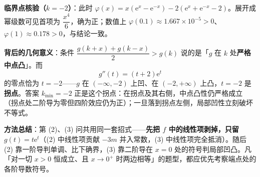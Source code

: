 \begin{gktip}
\textbf{临界点核验（$k=-2$）}：此时 $\varphi(x)=x\left(\mathrm e^x-\mathrm e^{-x}\right)-2\left(\mathrm e^x+\mathrm e^{-x}-2\right)$。展开成幂级数可见首项为 $\dfrac{x^4}{6}$，确为正；数值上 $\varphi(0.1)\approx1.667\times10^{-5}>0$、$\varphi(1)\approx0.178>0$，与结论一致。

\textbf{背后的几何意义}：条件 $\dfrac{g(k+x)+g(k-x)}{2}>g(k)$ 说的是「$g$ 在 $k$ 处\textbf{严格中点凸}」。而
\[g''(t)=(t+2)\mathrm e^{t}\]
的零点恰为 $t=-2$——$g$ 在 $(-\infty,-2)$ 上凹、在 $(-2,+\infty)$ 上凸，$t=-2$ 是\textbf{拐点}。答案 $k_{\min}=-2$ 正是这个拐点：在拐点及其右侧，中点凸性仍严格成立（拐点处二阶导为零但四阶效应仍为正）；一旦落到拐点左侧，局部凹性立刻破坏不等式。

\textbf{方法总结}：第 (2)、(3) 问共用同一套招式——\textbf{先把 $f$ 中的线性项剥掉，只留 $g(t)=t\mathrm e^t$}（(2) 中线性项贡献 $-3m$ 并入常数，(3) 中线性项完全抵消）。随后 (2) 靠一阶导判单调、比下确界，(3) 靠二阶导在 $x=0$ 处的符号判局部凹凸。凡「对一切 $x>0$ 恒成立、且 $x\to0^+$ 时两边相等」的题型，都应优先考察端点处的各阶导数符号。
\end{gktip}
